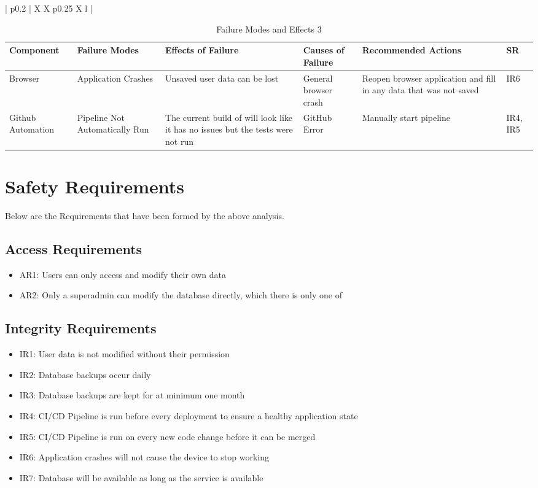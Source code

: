 \documentclass[12pt]{article}
\begin{document}
\begin{landscape}
\begin{table}[hp]
\begin{tabularx}{\linewidth}{| p{0.2\textwidth} | X X p{0.25\textwidth} X l |}
		\hline
		\end{tabularx}
\end{table}
\newpage
\begin{table}[hp]
	\caption{Failure Modes and Effects 3} \label{TblFMEA3}
	\begin{tabularx}{\linewidth}{| p{} | X X p{} X l |}
		\hline
		Component & Failure Modes & Effects of Failure & Causes of Failure & Recommended Actions & SR \\
		\hline
		Browser & Application Crashes & Unsaved user data can be lost & General browser crash & Reopen browser application and fill in any data that was not saved & IR6 \\
		\hline
		Github Automation & Pipeline Not Automatically Run & The current build of will look like it has no issues but the tests were not run & GitHub Error & Manually start pipeline & IR4, IR5 \\
		\hline
		\end{tabularx}
\end{table}
\end{landscape}

\section{Safety Requirements}
Below are the Requirements that have been formed by the above analysis.

\subsection{Access Requirements}
\begin{itemize}
	\item AR1: Users can only access and modify their own data
	\item AR2: Only a superadmin can modify the database directly, which there is only one of
\end{itemize}

\subsection{Integrity Requirements}
\begin{itemize}
	\item IR1: User data is not modified without their permission
	\item IR2: Database backups occur daily
	\item IR3: Database backups are kept for at minimum one month
	\item IR4: CI/CD Pipeline is run before every deployment to ensure a healthy application state
	\item IR5: CI/CD Pipeline is run on every new code change before it can be merged
	\item IR6: Application crashes will not cause the device to stop working
	\item IR7: Database will be available as long as the service is available
\end{itemize}
\end{document}
